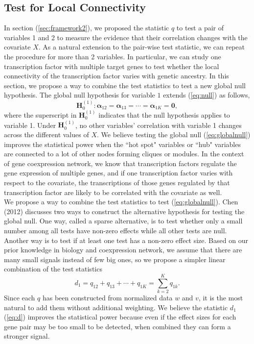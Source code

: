 \documentclass[aoas,preprint]{imsart}
\numberwithin{equation}{section}
\theoremstyle{plain}
\begin{document}
\subsection{Test for Local Connectivity \label{sec:frameworkK}} 
In section (\ref{sec:framework2}), we proposed the statistic $q$ to test a pair of variables 1 and 2 to measure the evidence that their correlation changes with the covariate $X$. As a natural extension to the pair-wise test statistic, we can repeat the procedure for more than 2 variables. In particular, we can study one transcription factor with  multiple target genes to test whether the local connectivity of the transcription factor varies with genetic ancestry. In this section, we propose a way to combine the test statistics to test a new global null hypothesis. The global null hypothesis for variable $1$ extends (\ref{eq:null}) as follows,
\begin{equation}
    \bm{H}_0^{(1)}: \bm{\alpha}_{12} = \bm{\alpha}_{13} = \cdots = \bm{\alpha}_{1K} = \bm{0},
\label{eq:globalnull}
\end{equation}
where the superscript in $\bm{H}_0^{(1)}$ indicates that the null hypothesis applies to variable 1. Under $\bm{H}_0^{(1)}$, no other variables' correlation with variable 1 changes across the different values of  $X$. We believe testing the global null (\ref{eq:globalnull}) improves the statistical power when the ``hot spot" variables or ``hub" variables are connected to a lot of other nodes forming cliques or modules. In the context of gene coexpression network, we know that transcription factors regulate the gene expression of multiple genes, and if one transcription factor varies with respect to the covariate, the transcriptions of those genes regulated by that transcription factor are likely to be correlated with the covariate as well. \\

We propose a way to combine the test statistics to test (\ref{eq:globalnull}). Chen (2012) discusses two ways to construct the alternative hypothesis \cite{chen2012exponential} for testing the global null. One way, called a sparse alternative, is to test whether only a small number among all tests have non-zero effects while all other tests are null. Another way is to test if at least one test has a non-zero effect size. Based on our prior knowledge in biology and coexpression network, we assume that there are many small signals instead of few big ones, so we propose a simpler linear combination of the test statistics
\begin{equation}
d_1 = {q}_{12} + {q}_{13} + \cdots + {q}_{1K} = \sum_{k=2}^{K} {q}_{1k}.
\label{eq:d}
\end{equation}
Since each $q$ has been constructed from normalized data $w$ and $v$, it is the most natural to add them without additional weighting. We believe the statistic $d_1$ (\ref{eq:d}) improves the statistical power because even if the effect sizes for each gene pair may be too small to be detected, when combined they can form a stronger signal. \\
\end{document}
